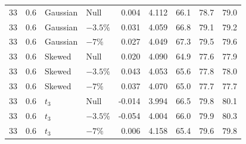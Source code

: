 \begin{table}[H]
\begin{tabular*}{\textwidth}{@{\extracolsep{\fill}}rrllrrrrr}
33 & 0.6 & Gaussian & Null & 0.004 & 4.112 & 66.1 & 78.7 & 79.0 \\
33 & 0.6 & Gaussian & $-3.5\%$ & 0.031 & 4.059 & 66.8 & 79.1 & 79.2 \\
33 & 0.6 & Gaussian & $-7\%$ & 0.027 & 4.049 & 67.3 & 79.5 & 79.6 \\
33 & 0.6 & Skewed & Null & 0.020 & 4.090 & 64.9 & 77.6 & 77.9 \\
33 & 0.6 & Skewed & $-3.5\%$ & 0.043 & 4.053 & 65.6 & 77.8 & 78.0 \\
33 & 0.6 & Skewed & $-7\%$ & 0.037 & 4.070 & 65.0 & 77.7 & 77.7 \\
33 & 0.6 & $t_3$ & Null & -0.014 & 3.994 & 66.5 & 79.8 & 80.1 \\
33 & 0.6 & $t_3$ & $-3.5\%$ & -0.054 & 4.004 & 66.0 & 79.9 & 80.3 \\
33 & 0.6 & $t_3$ & $-7\%$ & 0.006 & 4.158 & 65.4 & 79.6 & 79.8 \\
\bottomrule
\end{tabular*}
\end{table}

